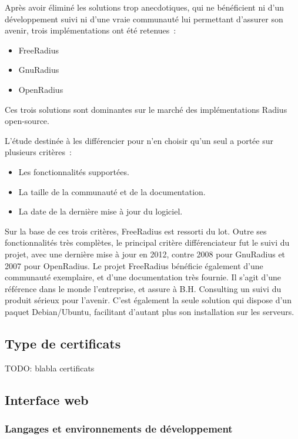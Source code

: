 Après avoir éliminé les solutions trop anecdotiques, qui ne bénéficient ni d'un développement suivi ni d'une vraie communauté lui permettant d'assurer son avenir, trois implémentations ont été retenues~:

\begin{itemize}
\item FreeRadius
\item GnuRadius
\item OpenRadius
\end{itemize}

Ces trois solutions sont dominantes sur le marché des implémentations Radius open-source.

L'étude destinée à les différencier pour n'en choisir qu'un seul a portée sur plusieurs critères~:

\begin{itemize}
\item Les fonctionnalités supportées.
\item La taille de la communauté et de la documentation.
\item La date de la dernière mise à jour du logiciel.
\end{itemize}

Sur la base de ces trois critères, FreeRadius est ressorti du lot. Outre ses fonctionnalités très complètes, le principal critère différenciateur fut le suivi du projet, avec une dernière mise à jour en 2012, contre 2008 pour GnuRadius et 2007 pour OpenRadius. Le projet FreeRadius bénéficie également d'une communauté exemplaire, et d'une documentation très fournie. Il s'agit d'une référence dans le monde l'entreprise, et assure à B.H. Consulting un suivi du produit sérieux pour l'avenir. C'est également la seule solution qui dispose d'un paquet Debian/Ubuntu, facilitant d'autant plus son installation sur les serveurs.

\subsection{Type de certificats}

TODO: blabla certificats

\subsection{Interface web}
\subsubsection{Langages et environnements de développement}

